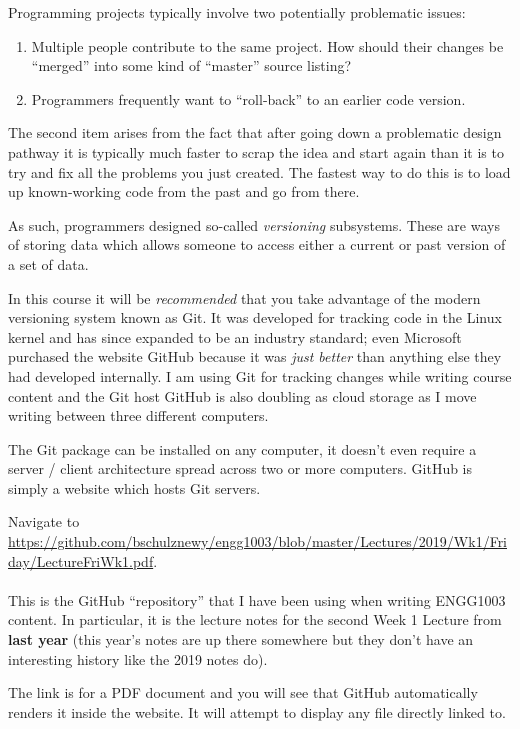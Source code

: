 \documentclass{lab}
\begin{document}
Programming projects typically involve two potentially problematic issues:

\begin{enumerate}
	\item Multiple people contribute to the same project. How should their changes be ``merged'' into some kind of ``master'' source listing?
	\item Programmers frequently want to ``roll-back'' to an earlier code version.
\end{enumerate}

The second item arises from the fact that after going down a problematic design pathway it is typically much faster to scrap the idea and start again than it is to try and fix all the problems you just created. The fastest way to do this is to load up known-working code from the past and go from there.

As such, programmers designed so-called \textit{versioning} subsystems. These are ways of storing data which allows someone to access either a current or past version of a set of data.

In this course it will be \textit{recommended} that you take advantage of the modern versioning system known as Git. It was developed for tracking code in the Linux kernel and has since expanded to be an industry standard; even Microsoft purchased the website GitHub because it was \textit{just better} than anything else they had developed internally. I am using Git for tracking changes while writing course content and the Git host GitHub is also doubling as cloud storage as I move writing between three different computers.

The Git package can be installed on any computer, it doesn't even require a server / client architecture spread across two or more computers. GitHub is simply a website which hosts Git servers.

\begin{task}{}{} Navigate to \url{https://github.com/bschulznewy/engg1003/blob/master/Lectures/2019/Wk1/Friday/LectureFriWk1.pdf}.
\\ \\ 
This is the GitHub ``repository'' that I have been using when writing ENGG1003 content. In particular, it is the lecture notes for the second Week 1 Lecture from \textbf{last year} (this year's notes are up there somewhere but they don't have an interesting history like the 2019 notes do).
\end{task}

The link is for a PDF document and you will see that GitHub automatically renders it inside the website. It will attempt to display any file directly linked to.
\end{document}
